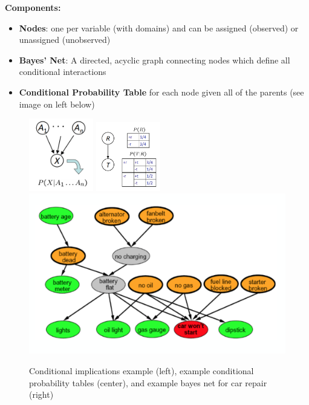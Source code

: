 \documentclass[11pt]{article}
\begin{document}
\textbf{Components:}
\begin{itemize}
  \item \textbf{Nodes}: one per variable (with domains) and can be assigned (observed) or unassigned (unobserved)
  \item \textbf{Bayes' Net}: A directed, acyclic graph connecting nodes which define all conditional interactions
  \item \textbf{Conditional Probability Table} for each node given all of the parents (see image on left below)
\end{itemize}
\begin{figure}[ht]
    \centering
    \includegraphics[width=0.25\textwidth]{figs/bayes1.png}
    \includegraphics[width=0.25\textwidth]{figs/bayes2.png}
    \includegraphics[scale=0.4]{figs/carrepair}
    \caption{Conditional implications example (left), example conditional probability tables (center), and example bayes net for car repair (right)}
    \label{fig:bayes}
\end{figure}
\end{document}
